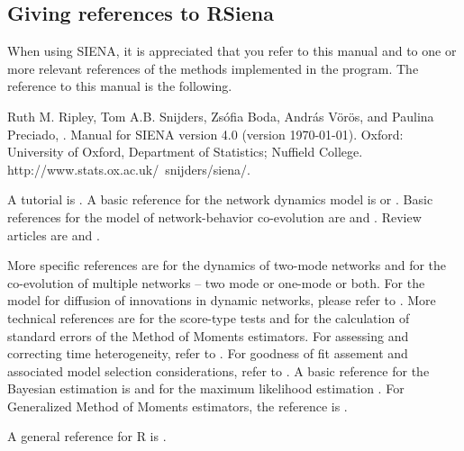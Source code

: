 \documentclass[a4paper,fleqn,11pt]{article}
\newcommand{\+}{\, + \,}
\newcommand{\R}{{\sf R }}
\newcommand{\si}{{\sf SIENA}}
\begin{document}
\newpage

\newpage

\subsection{Giving references to RSiena}

When using \si, it is appreciated that you refer to this manual and to one or
more relevant references of the methods implemented in the program.  The
reference to this manual is the following.  \smallskip

\noindent
Ruth M. Ripley, Tom A.B. Snijders, Zs\'{o}fia Boda,
 Andr\'{a}s V\"{o}r\"{o}s, and Paulina Preciado, \the\year.
Manual for SIENA version 4.0 (version \today).
Oxford: University of Oxford, Department of Statistics; Nuffield College.
\textsf{http://www.stats.ox.ac.uk/~snijders/siena/}.
\smallskip


A tutorial is \citet*{SnijdersEA10b}.
A basic reference for the network dynamics model is \citet{Snijders01}
or \citet{Snijders05}.
Basic references for the model of network-behavior co-evolution
are \citet*{SnijdersEA07} and \citet*{SteglichEA10}.
Review articles are \citet{Snijders2017} and \citet{SnijdersPickup16}.

More specific references are \citet{KoskinenEdling2012} for the
dynamics of two-mode networks and \citet{SLT2013} for the
co-evolution of multiple networks -- two mode or one-mode or both.
For the model for diffusion of innovations in dynamic networks,
please refer to \citet{Greenan15}.
More technical references are
\citet{Schweinberger12} for the score-type tests
and \citet{SchweinbergerSnijders07a} for the calculation of
standard errors of the Method of Moments estimators.
For assessing and correcting time heterogeneity, refer to \citet*{Lospinoso2011}.
For goodness of fit assement and associated model
selection considerations, refer to \citet{LospinosoSnijders2019}.
A basic reference for the Bayesian estimation is \citet{KoskinenSnijders07}
and for the maximum likelihood estimation \citet*{SnijdersEA10a}.
For Generalized Method of Moments estimators,
the reference is \citet*{ASS2015,ASS2019}.
\smallskip

A general reference for \R is \citet{R}.


\newpage
\end{document}
